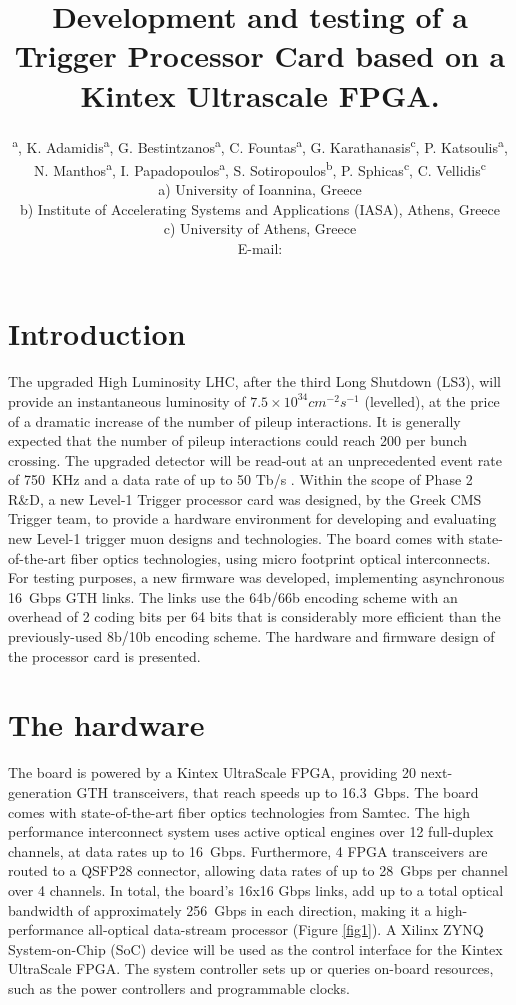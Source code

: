\documentclass[a4paper]{PoS}
\title{Development and testing of a Trigger Processor Card based on a Kintex Ultrascale FPGA.}
\author{\speaker{S. Mallios}\textsuperscript{ a}, K. Adamidis\textsuperscript{a}, G. Bestintzanos\textsuperscript{a}, C. Fountas\textsuperscript{a}, G. Karathanasis\textsuperscript{c}, P. Katsoulis\textsuperscript{a}, N. Manthos\textsuperscript{a}, I. Papadopoulos\textsuperscript{a}, S. Sotiropoulos\textsuperscript{b}, P. Sphicas\textsuperscript{c}, C. Vellidis\textsuperscript{c}\\
\llap a) University of Ioannina, Greece\\
\llap b) Institute of Accelerating Systems and Applications (IASA), Athens, Greece\\
\llap c) University of Athens, Greece\\
E-mail: \email{stavros.mallios@cern.ch}}
\begin{document}


\section{Introduction}
The upgraded High Luminosity LHC, after the third Long Shutdown (LS3), will provide an instantaneous luminosity of $7.5 \times 10^{34} cm^{-2} s^{-1}$ (levelled), at the price of a dramatic increase of the number of pileup interactions. It is generally expected that the number of pileup interactions could reach 200 per bunch crossing. The upgraded detector will be read-out at an unprecedented event rate of 750~KHz and a data rate of up to 50 Tb/s \cite{Collaboration:2283192}. Within the scope of Phase 2 R\&D, a new Level-1 Trigger processor card was designed, by the Greek CMS Trigger team, to provide a hardware environment for developing and evaluating new Level-1 trigger muon designs and technologies. The board comes with state-of-the-art fiber optics technologies, using micro footprint optical interconnects. For testing purposes, a new firmware was developed, implementing asynchronous 16~Gbps GTH links. The links use the 64b/66b encoding scheme with an overhead of 2 coding bits per 64 bits that is considerably more efficient than the previously-used 8b/10b encoding scheme. The hardware and firmware design of the processor card is presented.

\section{The hardware}
The board is powered by a Kintex UltraScale FPGA, providing 20 next-generation GTH transceivers, that reach speeds up to 16.3~Gbps. The board comes with state-of-the-art fiber optics technologies from Samtec. The high performance interconnect system uses active optical engines over 12 full-duplex channels, at data rates up to 16~Gbps. Furthermore, 4 FPGA transceivers are routed to a QSFP28 connector, allowing data rates of up to 28~Gbps per channel over 4 channels. In total, the board's 16x16 Gbps links, add up to a total optical bandwidth of approximately 256~Gbps in each direction, making it a high-performance all-optical data-stream processor (Figure \ref{fig1}). A Xilinx ZYNQ System-on-Chip (SoC) device will be used as the control interface for the Kintex UltraScale FPGA. The system controller sets up or queries on-board resources, such as the power controllers and programmable clocks.
\end{document}
